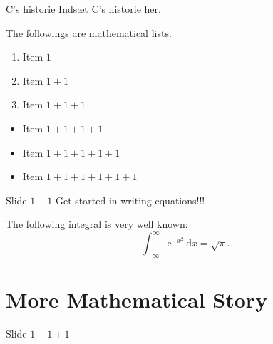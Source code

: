 \documentclass{beamer}
\begin{document}
\begin{frame}{C's historie}
  Indsæt C's historie her.

  \pause

  The followings are mathematical lists.

  \begin{enumerate}
  \item Item $1$\pause
  \item Item $1+1$\pause
  \item Item $1+1+1$
  \end{enumerate}

  \pause

  \begin{itemize}
  \item Item $1+1+1+1$\pause
  \item Item $1+1+1+1+1$\pause
  \item Item $1+1+1+1+1+1$
  \end{itemize}
\end{frame}

\begin{frame}{Slide $1+1$}
  \alert{Get started in writing equations!!!}

  \begin{theorem}
    The following integral is very well known:
    \begin{equation}
      \int_{-\infty}^\infty \mathrm{e}^{-x^2}\,\mathrm{d}x=\sqrt{\pi}.
    \end{equation}

  \end{theorem}
\end{frame}

\section{More Mathematical Story}
\begin{frame}{Slide $1+1+1$}
\end{frame}
\end{document}
